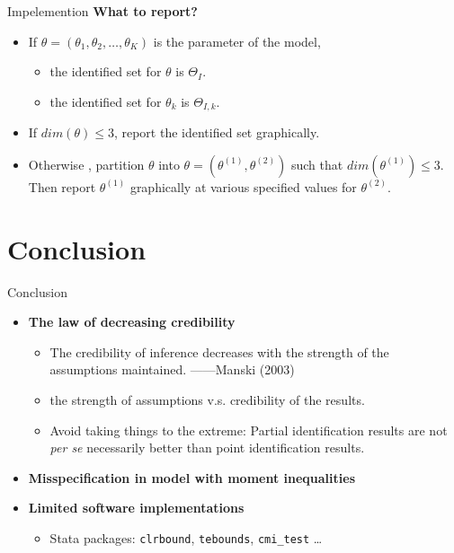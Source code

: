 \documentclass[aspectratio=169]{beamer}  %
\begin{document}
\begin{frame}{Impelemention}
    \textbf{What to report?}
    \begin{itemize}
        \item If $\theta=(\theta_1,\theta_2,\ldots,\theta_K)$ is the parameter of the model, 
        \begin{itemize}
            \item the identified set for $\theta$ is $\Theta_I$.
            \item the identified set for $\theta_k$ is $\Theta_{I,k}$.
        \end{itemize}
    \item If $dim(\theta)\le 3$, report the identified set graphically.
    \item Otherwise , partition $\theta$ into $\theta=(\theta^{(1)},\theta^{(2)})$ such that $dim(\theta^{(1)})\le 3$. Then report $\theta^{(1)}$ graphically at various specified values for $\theta^{(2)}$.
    \end{itemize}
\end{frame}

\section{Conclusion}
\begin{frame}{Conclusion}
    \begin{itemize}
        \item \textbf{The law of decreasing credibility}
        \begin{itemize}
            
            \item The credibility of inference decreases with the strength of the assumptions maintained. ——Manski (2003)
            \item the strength of assumptions v.s. credibility of the results.

            \item Avoid taking things to the extreme: Partial identification results are not {\em per se} necessarily better than point identification results.
        \end{itemize}
        \item \textbf{Misspecification in model with moment inequalities}
        \item \textbf{Limited software implementations}
        \begin{itemize}
            \item Stata packages: \texttt{clrbound}, \texttt{tebounds}, \texttt{cmi\_test} \ldots
        \end{itemize}
    \end{itemize}
\end{frame}
\end{document}
